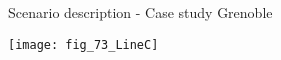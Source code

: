 \begin{frame}{Scenario description - Case study Grenoble}
\begin{center}
\texttt{[image: fig\_73\_LineC]}
\end{center}
\end{frame}